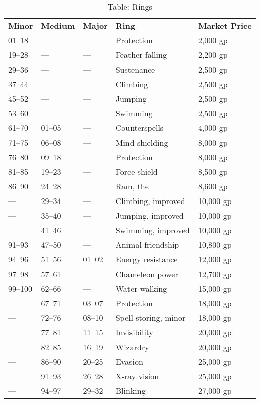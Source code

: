 \begin{table}[]
\sffamily
\caption{Table: Rings}
\setlength{\tabcolsep}{1pt}
\begin{tabularx}{\linewidth}{lllXl}
\textbf{Minor} & \textbf{Medium} & \textbf{Major} & \textbf{Ring} & \textbf{Market Price}\\
01--18 & --- & --- & Protection & 2,000 gp \\
 19--28 & --- & --- & Feather falling & 2,200 gp \\
 29--36 & --- & --- & Sustenance & 2,500 gp \\
 37--44 & --- & --- & Climbing & 2,500 gp \\
 45--52 & --- & --- & Jumping & 2,500 gp \\
 53--60 & --- & --- & Swimming & 2,500 gp \\
 61--70 & 01--05 & --- & Counterspells & 4,000 gp \\
 71--75 & 06--08 & --- & Mind shielding & 8,000 gp \\
 76--80 & 09--18 & --- & Protection & 8,000 gp \\
 81--85 & 19--23 & --- & Force shield & 8,500 gp \\
 86--90 & 24--28 & --- & Ram, the & 8,600 gp \\
 --- & 29--34 & --- & Climbing, improved & 10,000 gp \\
 --- & 35--40 & --- & Jumping, improved & 10,000 gp \\
 --- & 41--46 & --- & Swimming, improved & 10,000 gp \\
 91--93 & 47--50 & --- & Animal friendship & 10,800 gp \\
 94--96 & 51--56 & 01--02 & Energy resistance & 12,000 gp \\
 97--98 & 57--61 & --- & Chameleon power & 12,700 gp \\
 99--100 & 62--66 & --- & Water walking & 15,000 gp \\
 --- & 67--71 & 03--07 & Protection & 18,000 gp \\
 --- & 72--76 & 08--10 & Spell storing, minor & 18,000 gp \\
 --- & 77--81 & 11--15 & Invisibility & 20,000 gp \\
 --- & 82--85 & 16--19 & Wizardry & 20,000 gp \\
 --- & 86--90 & 20--25 & Evasion & 25,000 gp \\
 --- & 91--93 & 26--28 & X-ray vision & 25,000 gp \\
 --- & 94--97 & 29--32 & Blinking & 27,000 gp \\

\end{tabularx}
\end{table}
